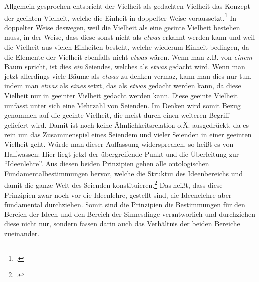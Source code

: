 Allgemein gesprochen entspricht der Vielheit als gedachten Vielheit das Konzept der geeinten Vielheit, welche die Einheit in doppelter Weise voraussetzt.\footcite[vgl.][S. 97]{halfwassen2015spuren}
In doppelter Weise deswegen, weil die Vielheit als eine geeinte Vielheit bestehen muss, in der Weise, dass diese sonst nicht als \emph{etwas} erkannt werden kann und weil die Vielheit aus vielen Einheiten besteht, welche wiederum Einheit bedingen, da die Elemente der Vielheit ebenfalls nicht \emph{etwas} wären. Wenn man z.B. von \emph{einem} Baum spricht, ist dies \emph{ein} Seiendes, welches als \emph{etwas} gedacht wird. Wenn man jetzt allerdings viele Bäume als \emph{etwas} zu denken vermag, kann man dies nur tun, indem man \emph{etwas} als \emph{eines} setzt, das als \emph{etwas} gedacht werden kann, da diese Vielheit nur in geeinter Vielheit gedacht werden kann. Diese geeinte Vielheit umfasst unter sich eine Mehrzahl von Seienden. Im Denken wird somit Bezug genommen auf die geeinte Vielheit, die meist durch einen weiteren Begriff geliefert wird. Damit ist noch keine Ähnlichkeitsrelation o.Ä. ausgedrückt, da es rein um das Zusammenspiel eines Seiendem und vieler Seienden in einer geeinten Vielheit geht. 
Würde man dieser Auffassung widersprechen, so heißt es von Halfwassen:
Hier liegt jetzt der übergreifende Punkt und die Überleitung zur \enquote{Ideenlehre}. Aus diesen beiden Prinzipien gehen alle ontologischen Fundamentalbestimmungen hervor, welche die Struktur des Ideenbereichs und damit die ganze Welt des Seienden konstituieren.\footcite[vgl.][S. 104]{halfwassen2015spuren} Das heißt, dass diese Prinzipien zwar noch vor die Ideenlehre, gestellt sind, die Ideenelehre aber fundamental durchziehen. Somit sind die Prinzipien die Bestimmungen für den Bereich der Ideen und den Bereich der Sinnesdinge verantworlich und durchziehen diese nicht nur, sondern fassen darin auch das Verhältnis der beiden Bereiche zueinander.

